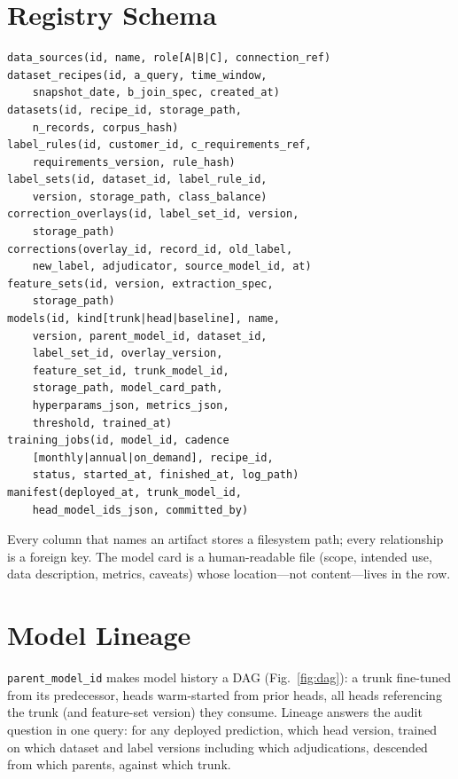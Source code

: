 \documentclass[conference]{IEEEtran}
\begin{document}
\section{Registry Schema}
\begin{lstlisting}
data_sources(id, name, role[A|B|C], connection_ref)
dataset_recipes(id, a_query, time_window,
    snapshot_date, b_join_spec, created_at)
datasets(id, recipe_id, storage_path,
    n_records, corpus_hash)
label_rules(id, customer_id, c_requirements_ref,
    requirements_version, rule_hash)
label_sets(id, dataset_id, label_rule_id,
    version, storage_path, class_balance)
correction_overlays(id, label_set_id, version,
    storage_path)
corrections(overlay_id, record_id, old_label,
    new_label, adjudicator, source_model_id, at)
feature_sets(id, version, extraction_spec,
    storage_path)
models(id, kind[trunk|head|baseline], name,
    version, parent_model_id, dataset_id,
    label_set_id, overlay_version,
    feature_set_id, trunk_model_id,
    storage_path, model_card_path,
    hyperparams_json, metrics_json,
    threshold, trained_at)
training_jobs(id, model_id, cadence
    [monthly|annual|on_demand], recipe_id,
    status, started_at, finished_at, log_path)
manifest(deployed_at, trunk_model_id,
    head_model_ids_json, committed_by)
\end{lstlisting}
Every column that names an artifact stores a filesystem path; every relationship is a foreign key. The model card is a human-readable file (scope, intended use, data description, metrics, caveats) whose location---not content---lives in the row.

\section{Model Lineage}
\texttt{parent\_model\_id} makes model history a DAG (Fig.~\ref{fig:dag}): a trunk fine-tuned from its predecessor, heads warm-started from prior heads, all heads referencing the trunk (and feature-set version) they consume. Lineage answers the audit question in one query: for any deployed prediction, which head version, trained on which dataset and label versions including which adjudications, descended from which parents, against which trunk.
\end{document}
